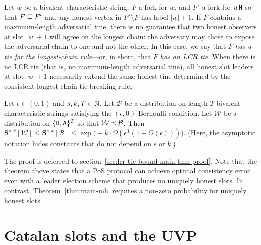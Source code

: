  Let $w$ be a bivalent characteristic string, $F$ a fork for $w$, and
  $F'$ a fork for $w\mathtt{H}$ so that $F \sqsubseteq F'$ and any honest
  vertex in $F' \setminus F$ has label $|w| + 1$.  If $F$ contains a
  maximum-length adversarial tine, there is no guarantee that two
  honest observers at slot $|w| + 1$ will agree on the longest chain:
  the adversary may chose to expose the adversarial chain to one and
  not the other.
  In this case, we say that \emph{$F$ has a tie for the longest-chain
  rule}---or, in short, that \emph{$F$ has an LCR tie}.  
  When there
  is no LCR tie (that is, no maximum-length adversarial tine), all
  honest slot leaders at slot $|w| + 1$ necessarily extend the same
  honest tine determined by the consistent longest-chain tie-breaking
  rule.



  \begin{theorem}\label{thm:main-mh-bivalent}
    Let $\epsilon \in (0, 1)$ and $s, k, T \in \mathbb{N}$.  
    Let $\mathcal{B}$ be a distribution 
    on length-$T$ bivalent characteristic strings 
    satisfying the $(\epsilon, 0)$-Bernoulli condition. 
    Let 
    $\mathcal{W}$ be a distribution on
    $\{\mathtt{H}, \mathtt{A}\}^T$ so that 
    $\mathcal{W} \preceq \mathcal{B}$. 
    Then 
    $
      \mathbf{S}^{s,k}[\mathcal{W}] 
        \leq \mathbf{S}^{s,k}[\mathcal{B}] 
        \leq 
        \exp\bigl(-k \cdot \Omega(\epsilon^3 (1 + O(\epsilon) ) )\bigr)
    $. 
    (Here, the asymptotic notation hides constants that do not depend on $\epsilon$ or $k$.)
  \end{theorem}

  The proof is deferred to section~\ref{sec:lcr-tie-bound-main-thm-proof}.
  Note that the theorem above states that a 
  PoS protocol can achieve optimal consistency error 
  even with a leader election scheme 
  that produces no uniquely honest slots. 
  In contrast, Theorem~\ref{thm:main-mh} requires 
  a non-zero probability for uniquely honest slots.


\section{Catalan slots and the UVP}\label{sec:catalan-uvi-lcr-tie}
  

